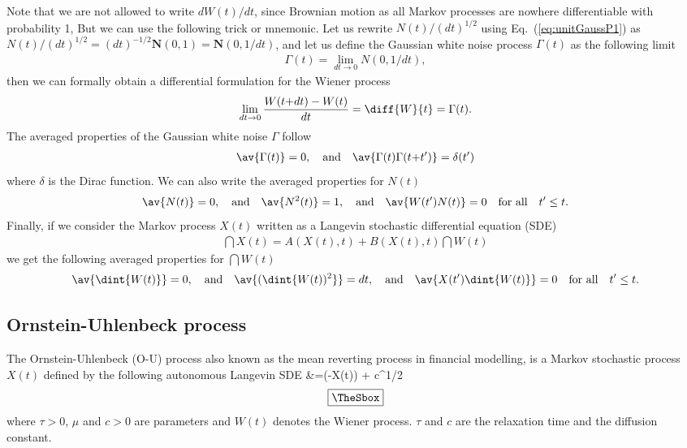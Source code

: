 \documentclass[10pt,a4paper]{article}
\newcommand{\eq}[1]{Eq.~(\ref{#1})}
\newcommand{\gaussian}{\ensuremath{\mathbf{N}}}
\newcommand{\OU}{\renewcommand{\OU}{O-U\xspace}Ornstein-Uhlenbeck (O-U)\xspace}
\newcommand{\SDE}{\renewcommand{\SDE}{SDE\xspace}stochastic differential equation
(SDE)\xspace}
\newlength{\mylength}
\newenvironment{falign}%
{\setlength{\fboxsep}{5pt}
\setlength{\fboxrule}{0.5pt}
\setlength{\mylength}{\textwidth}
\addtolength{\mylength}{-2\fboxsep}
\addtolength{\mylength}{-2\fboxrule}
\Sbox
\minipage{\mylength}%
	\setlength{\abovedisplayskip}{-2\lineskip}
	\setlength{\belowdisplayskip}{-2\lineskip}
\align}%
{\endalign\endminipage\endSbox
\[\fbox{\TheSbox}\]}
\begin{document}
Note that we are not allowed to write $dW(t)/dt$, since Brownian motion
as all Markov processes are nowhere differentiable with probability 1,
But we can use the following trick or mnemonic. 
Let us rewrite $N(t)/(dt)^{1/2}$ using \eq{eq:unitGaussP1} as 
$N(t)/(dt)^{1/2}=(dt)^{-1/2}\gaussian(0,1)=\gaussian(0,1/dt)$, and
let us define the Gaussian white noise process $\Gamma(t)$ as the following
limit \citep{gillespie:1996a}
\begin{align}
\Gamma(t) = \lim_{dt\rightarrow0} N(0,1/dt),
\end{align}
then we can formally obtain a differential formulation for the Wiener process
\begin{align}
\lim_{dt\rightarrow0} \frac{W(t{+}dt)-W(t)}{dt} =
\diff{W}{t} = \Gamma(t). \label{eq:Wiener2}
\end{align}
The averaged properties of the Gaussian white noise $\Gamma$ follow
\begin{align}
\av{\Gamma(t)} = 0, \quad\text{and}\quad \av{\Gamma(t)\Gamma(t{+}t^\prime)} =
\delta(t^\prime)
\end{align}
where $\delta$ is the Dirac function. We can also write the averaged
properties for $N(t)$
\begin{align}
\av{N(t)} = 0, \quad\text{and}\quad \av{N^2(t)} = 1,
\quad\text{and}\quad \av{W(t^\prime)N(t)} = 0\quad\text{for all}\quad
t^\prime\leq t.
\end{align}
Finally, if we consider the Markov process $X(t)$ written as a Langevin
\SDE \citep{oksendal:2000}
\begin{align}
\dint{X(t)}=A(X(t),t)+B(X(t),t)\dint{W(t)}
\end{align}
we get the following averaged properties for $\dint{W(t)}$
\begin{align}
\av{\dint{W(t)}} = 0, \quad\text{and}\quad \av{(\dint{W(t))^2}} = dt,
\quad\text{and}\quad \av{X(t^\prime)\dint{W(t)}} = 0\quad\text{for all}\quad
t^\prime\leq t.
\end{align}

\subsection{Ornstein-Uhlenbeck process}

The \OU process \citep{uhlenbeck:1930} also known as the mean
reverting process in financial modelling, is a Markov stochastic process $X(t)$
defined by the following autonomous Langevin \SDE
\begin{falign}
&=(\mu-X(t)) + c^{1/2} 
\label{eq:ou}
\end{falign}
where $\tau>0$, $\mu$ and $c>0$ are parameters and $W(t)$ denotes the
Wiener process. $\tau$ and $c$ are the relaxation time and the
diffusion constant. 
\end{document}

